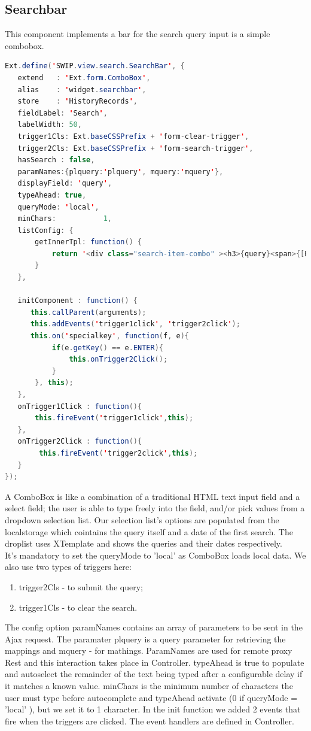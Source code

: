 \subsection{Searchbar} 
\par This component implements a bar for the search query input is a simple combobox. \\
\begin{lstlisting}[language=Java]
Ext.define('SWIP.view.search.SearchBar', {
   extend   : 'Ext.form.ComboBox',
   alias    : 'widget.searchbar',
   store    : 'HistoryRecords', 
   fieldLabel: 'Search',
   labelWidth: 50,
   trigger1Cls: Ext.baseCSSPrefix + 'form-clear-trigger',
   trigger2Cls: Ext.baseCSSPrefix + 'form-search-trigger',
   hasSearch : false,
   paramNames:{plquery:'plquery', mquery:'mquery'},
   displayField: 'query',
   typeAhead: true,
   queryMode: 'local',
   minChars:           1,
   listConfig: {
       getInnerTpl: function() {
           return '<div class="search-item-combo" ><h3>{query}<span>{[Ext.Date.format(values.searchDate, "l, F d, Y g:i:s A")]}<br /></span></h3></div>';
       }
   },
   
   initComponent : function() {
      this.callParent(arguments);
      this.addEvents('trigger1click', 'trigger2click');
      this.on('specialkey', function(f, e){
           if(e.getKey() == e.ENTER){
               this.onTrigger2Click();
           }
       }, this); 
   },
   onTrigger1Click : function(){
       this.fireEvent('trigger1click',this);
   },
   onTrigger2Click : function(){
        this.fireEvent('trigger2click',this);
   }
});
\end{lstlisting}
\par A ComboBox is like a combination of a traditional HTML text input field and a select field; the user is able to type freely into the field, and/or pick values from a dropdown selection list. Our selection list's options are populated from the localstorage which cointains the query itself and a date of the first search. The droplist uses XTemplate and shows the queries and their dates respectively.\\
It’s mandatory to set the queryMode to 'local' as ComboBox loads local data. We also use two types of triggers here:
   \begin{enumerate}
   	\item trigger2Cls - to submit the query;
    \item trigger1Cls - to clear the search.
   \end{enumerate}   
\par The config option paramNames contains an array of parameters to be sent in the Ajax request. The paramater plquery is a query parameter for retrieving the mappings and  mquery - for mathings. ParamNames are used for remote proxy Rest and this interaction takes place in Controller.
typeAhead is true to populate and autoselect the remainder of the text being typed after a configurable delay if it matches a known value.
minChars is the minimum number of characters the user must type before autocomplete and typeAhead activate (0 if queryMode = 'local' ), but we set it to 1 character. In the init function we added 2 events that fire when the triggers are clicked. The event handlers are defined in Controller. \\
